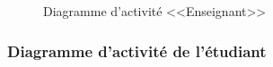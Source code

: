 \documentclass[12pt]{report}
\begin{document}
\begin{figure}[h]
\centering
    \centerline{}
    \caption{Diagramme d'activité <<Enseignant>>}
\end{figure}

\newpage

\subsubsection{Diagramme d'activité de l'étudiant}

\vspace{0.3in}
\end{document}
